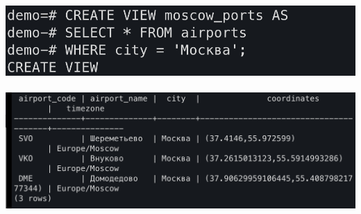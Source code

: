 \documentclass[a4paper,12pt]{article}
\begin{document}
\\\\
\includegraphics[scale=0.5]{173.png}
\\\\
\includegraphics[scale=0.5]{174.png}
\\\\
\clearpage
\end{document}
